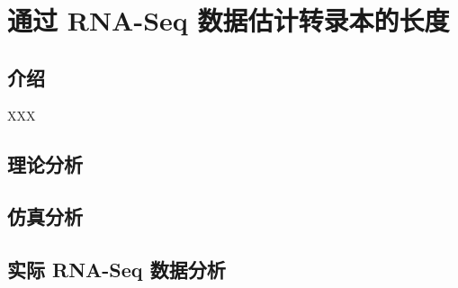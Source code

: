 \chapter{通过 RNA-Seq 数据估计转录本的长度}

\section{介绍}
XXX \cite{Vatinlen20081390}

\section{理论分析}

\section{仿真分析}

\section{实际 RNA-Seq 数据分析}


